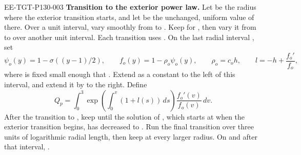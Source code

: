 \begin{EESegment}{EE-TGT-P130-003}
\noindent\textbf{Transition to the exterior power law.} Let
 be the radius where the exterior transition starts,
and let  be the unchanged, uniform value of
 there. Over a unit interval, vary
 smoothly from  to
. Keep  for
, then vary it from  to
 over another unit interval. Each transition uses
. On the last radial interval
, set
\begin{equation}
\psi_o(y)=1-\sigma((y-1)/2),
\qquad
f_o(y)=1-\rho_o\psi_o(y),
\qquad
\rho_o=c_oh,
\qquad
l=-h+\frac{f_o'}{f_o},
\tag{A.12}\label{eq:A.12}
\end{equation}
where  is fixed small enough that
. Extend  as a
constant to the left of this interval, and extend it by  to the
right. Define
\begin{equation}
Q_p=\int_0^3\exp\left(\int_0^v(1+l(s))\,ds\right)\frac{f_o'(v)}{f_o(v)}\,dv.
\tag{A.13}\label{eq:A.13}
\end{equation}
After the transition to , keep
 until the solution of
, which starts at
 when the exterior transition begins,
has decreased to . Run the final transition over three units of
logarithmic radial length, then keep  at every larger radius.
On and after that interval, .
\end{EESegment}

